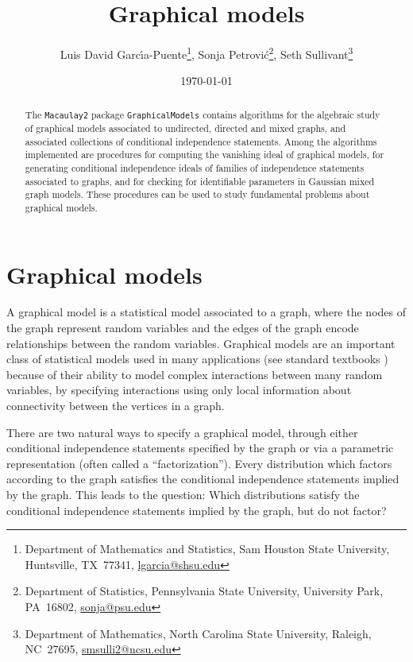 \documentclass[letterpaper]{article}
\title{Graphical models}
\author{Luis David  Garc\'{\i}a-Puente\footnote{Department of Mathematics and Statistics,         Sam Houston State University,          Huntsville, TX\ 77341, \href{mailto:lgarcia@shsu.edu}{lgarcia@shsu.edu}},
 Sonja Petrovi\'c\footnote{Department of Statistics,       Pennsylvania State University,           University Park, PA\ 16802, \href{mailto:petrovic@psu.edu}{sonja@psu.edu}}, 
 Seth Sullivant\footnote{Department of Mathematics,   North Carolina State University, Raleigh, NC\ 27695, \href{mailto:smsulli2@ncsu.edu}{smsulli2@ncsu.edu}}}
\date{\today}
\theoremstyle{plain}
\theoremstyle{definition}
\begin{document}
\maketitle


\begin{abstract}
The {\tt Macaulay2} package {\tt GraphicalModels} contains algorithms 
for the algebraic study of graphical models associated to undirected, 
directed and mixed graphs, 
and associated collections of 
conditional independence statements. 
Among the algorithms implemented are procedures for computing
the vanishing ideal of graphical models, for generating
conditional independence ideals of families of independence statements
associated to graphs, and for checking for identifiable parameters
in Gaussian mixed graph models.
These procedures can be used to study fundamental 
problems about graphical models. 
\end{abstract}


\section{Graphical models}\label{intro}

A graphical model is a statistical model associated to a graph,
where the nodes of the graph represent random variables and the
edges of the graph encode relationships between the random variables.
Graphical models are an important class of statistical models used
in many applications (see standard textbooks \cite{Lauritzen, Whitaker})
because of their ability to model complex interactions between
many random variables, by specifying
interactions using only local information about connectivity
between the vertices in a graph.

There are two natural ways to specify a graphical model, through 
either conditional independence statements specified by the graph
or via a parametric representation (often called a ``factorization'').
Every distribution which factors according to the graph
satisfies the conditional independence statements implied by the 
graph. This leads to the question:  Which distributions satisfy the conditional
independence statements implied by the graph, but do not factor?
\end{document}
